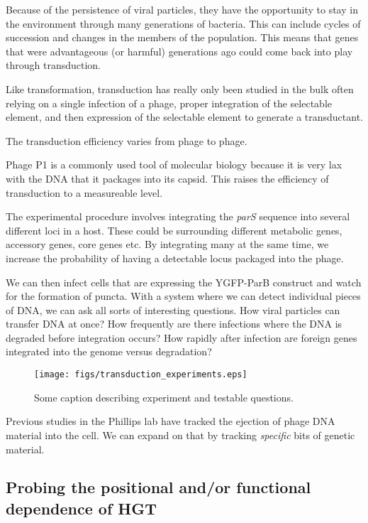 Because of the persistence of viral particles, they have the opportunity to stay
in the environment through many generations of bacteria. This can include cycles
of succession and changes in the members of the population.  This means that
genes that were advantageous (or harmful) generations ago could come back into
play through transduction.

Like transformation, transduction has really only been studied in the bulk often
relying on a single infection of a phage, proper integration of the selectable
element, and then expression of the selectable element to generate a
transductant. 

The transduction efficiency varies from phage to phage. 

Phage P1 is a commonly used tool of molecular biology because it is very lax
with the DNA that it packages into its capsid. This raises the efficiency of
transduction to a measureable level. 

The experimental procedure involves integrating the \textit{parS} sequence into
several different loci in a host.  These could be surrounding different
metabolic genes, accessory genes,  core genes etc. By integrating many at the
same time, we increase the probability of having a detectable locus packaged
into the phage.

We can then infect cells that are expressing the YGFP-ParB construct and watch
for the formation of puncta. With a system where we can detect individual pieces
of DNA, we can ask all sorts of interesting questions. How viral particles can
transfer DNA at once? How frequently are there infections where the DNA is
degraded before integration occurs? How rapidly after infection are foreign
genes integrated into the genome versus degradation? 

\begin{figure}
	\centerline{\texttt{[image: figs/transduction\_experiments.eps]}}
	\caption{Some caption describing experiment and testable questions.}
	\label{fig:transduction_exp}
\end{figure}

Previous studies in the Phillips lab have tracked the ejection of phage DNA
material into the cell. We can expand on that by tracking \textit{specific} bits
of genetic material.


\subsection*{Probing the positional and/or functional dependence of HGT}


